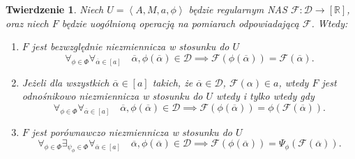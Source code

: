 \documentclass[12pt,a4paper]{report}
\newtheorem{tw}[definition]{Twierdzenie}
\newcommand{\domkniecie}[1]{\left\lbrack{#1}\right\rbrack}
\newcommand{\tuple}[1]{\left\langle {#1} \right\rangle}
\begin{document}
\begin{tw}
Niech $U=\tuple{A,M,a,\phi}$ będzie regularnym NAS $\mathcal{F}:\mathcal{D}\to \domkniecie{\mathbb{R}}$, oraz niech $F$ będzie uogólnioną operacją na pomiarach odpowiadającą $\mathcal{F}$. Wtedy:
\begin{enumerate}
\item
$F$ jest bezwzględnie niezmiennicza w stosunku do $U$ 
$$
\forall_{\phi \in \Phi} \forall_{\overline{\alpha} \in \domkniecie{a}} \quad \overline{\alpha}, \phi(\overline{\alpha}) \in \mathcal{D} \implies \mathcal{F}(\phi(\overline{\alpha}))=\mathcal{F}(\overline{\alpha}).
$$
\item
Jeżeli dla wszystkich $\overline{\alpha} \in \domkniecie{a}$ takich, że $\overline{\alpha} \in \mathcal{D}$, $\mathcal{F}(\alpha)\in a$, wtedy $F$ jest odnośnikowo niezmiennicza w stosunku do $U$ wtedy i tylko wtedy gdy 
\begin{equation*}
\forall_{\phi \in \Phi} \forall_{\overline{\alpha} \in \domkniecie{a}} \quad \overline{\alpha}, \phi(\overline{\alpha}) \in \mathcal{D} \implies \mathcal{F}(\phi(\overline{\alpha}))=\phi(\mathcal{F}(\overline{\alpha})).
\end{equation*}
\item
$F$ jest porównawczo niezmiennicza w stosunku do $U$  $$
\forall_{\phi \in \Phi}  \exists_{\psi_{\phi}\in \Phi} \forall_{\overline{\alpha} \in \domkniecie{a}} \quad \overline{\alpha}, \phi(\overline{\alpha}) \in \mathcal{D} \implies \mathcal{F}(\phi(\overline{\alpha}))=\Psi_{\phi}(\mathcal{F}(\overline{\alpha})).
$$
\end{enumerate}
\end{tw}
\end{document}

